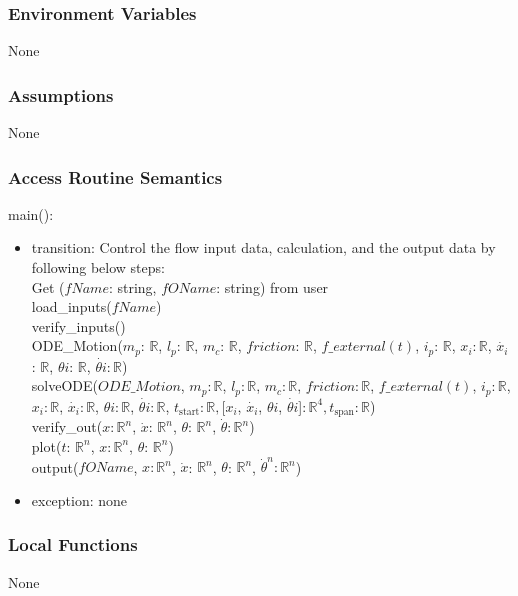\documentclass[12pt, titlepage]{article}
\begin{document}
\subsubsection{Environment Variables}
None
\subsubsection{Assumptions}
None

\subsubsection{Access Routine Semantics}

\noindent main():
\begin{itemize}
\item transition: Control the flow input data, calculation, and the output data by following below steps: \\
\noindent Get ($fName$: string, $fOName$: string) from user\\
\noindent load\_inputs($fName$)\\
\noindent verify\_inputs()\\
\noindent ODE\_Motion($ m_p$: $\mathbb{R}$, $l_p$: $\mathbb{R}$, $m_c$: $\mathbb{R}$, $friction$: $\mathbb{R}$, $f\_external(t)$, $i_p$: $\mathbb{R}$, $x_i: \mathbb{R}$, $\dot{x_i}$: $\mathbb{R}$, $\theta{i}$: $\mathbb{R}$, $\dot{\theta{i}}$$: \mathbb{R}$)\\
\noindent solveODE($ODE\_Motion$, $ m_p: \mathbb{R}$, $l_p: \mathbb{R}$, $m_c: \mathbb{R}$, $friction: \mathbb{R}$, $f\_external(t)$, $i_p: \mathbb{R}$, $x_i: \mathbb{R}$, $\dot{x_i}: \mathbb{R}$, $\theta{i}: \mathbb{R}$, $\dot{\theta{i}}: \mathbb{R}$,  $t_\text{start}: \mathbb{R}$$, $[$x_i$, $\dot{x_i}$, $\theta{i}$, $\dot{\theta{i}}$]$: \mathbb{R}^4, t_\text{span}: \mathbb{R}$)\\
\noindent verify\_out($x$$: \mathbb{R}^{n}$, $\dot{x}$: $\mathbb{R}^{n}$, $\theta$: $\mathbb{R}^{n}$, $\dot{\theta}$$: \mathbb{R}^{n}$)\\
\noindent plot($t$: $\mathbb{R}^{n}$, $x$$: \mathbb{R}^{n}$, $\theta$: $\mathbb{R}^{n}$)\\
\noindent output($fOName$, $x$$: \mathbb{R}^{n}$, $\dot{x}$: $\mathbb{R}^{n}$, $\theta$: $\mathbb{R}^{n}$, $\dot{\theta}^{n}$$: \mathbb{R}^{n}$)\\
\item exception: none
\end{itemize}

\subsubsection{Local Functions}
None
\end{document}
